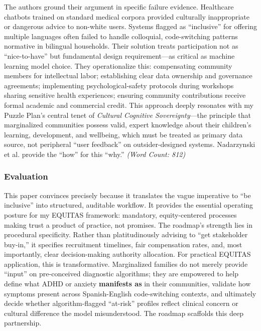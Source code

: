 \documentclass[11pt,twoside]{article}
\begin{document}
The authors ground their argument in specific failure evidence. Healthcare chatbots trained on standard medical corpora provided culturally inappropriate or dangerous advice to non-white users. Systems flagged as ``inclusive'' for offering multiple languages often failed to handle colloquial, code-switching patterns normative in bilingual households. Their solution treats participation not as ``nice-to-have'' but fundamental design requirement---as critical as machine learning model choice. They operationalize this: compensating community members for intellectual labor; establishing clear data ownership and governance agreements; implementing psychological-safety protocols during workshops sharing sensitive health experiences; ensuring community contributions receive formal academic and commercial credit. This approach deeply resonates with my Puzzle Plan's central tenet of \textit{Cultural Cognitive Sovereignty}---the principle that marginalized communities possess valid, expert knowledge about their children's learning, development, and wellbeing, which must be treated as primary data source, not peripheral ``user feedback'' on outsider-designed systems. Nadarzynski et al. provide the ``how'' for this ``why.'' \textit{(Word Count: 812)}

\newpage

\subsubsection*{Evaluation}

\vspace{-0.3cm}

This paper convinces precisely because it translates the vague imperative to ``be inclusive'' into structured, auditable workflow. It provides the essential operating posture for my EQUITAS framework: mandatory, equity-centered processes making trust a product of practice, not promises. The roadmap's strength lies in procedural specificity. Rather than platitudinously advising to ``get stakeholder buy-in,'' it specifies recruitment timelines, fair compensation rates, and, most importantly, clear decision-making authority allocation. For practical EQUITAS application, this is transformative. Marginalized families do not merely provide ``input'' on pre-conceived diagnostic algorithms; they are empowered to help define what ADHD or anxiety \textbf{manifests as} in their communities, validate how symptoms present across Spanish-English code-switching contexts, and ultimately decide whether algorithm-flagged ``at-risk'' profiles reflect clinical concern or cultural difference the model misunderstood. The roadmap scaffolds this deep partnership.
\end{document}
